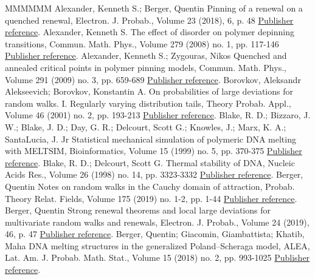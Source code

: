 \documentclass[11pt]{article}
\theoremstyle{definition}
\numberwithin{equation}{section}
\numberwithin{figure}{section}
\numberwithin{table}{section}
\begin{document}
\begin{thebibliography}{MMMMMM}
 Alexander, Kenneth S.; Berger, Quentin Pinning of a renewal on a quenched renewal, Electron. J. Probab., Volume 23 (2018), 6, p. 48 \href{https://ahl.centre-mersenne.org/item/AHL_2020__3__299_0/#cf:AB18}{Publisher reference}.
 Alexander, Kenneth S. The effect of disorder on polymer depinning transitions, Commun. Math. Phys., Volume 279 (2008) no. 1, pp. 117-146 \href{https://ahl.centre-mersenne.org/item/AHL_2020__3__299_0/#cf:A08}{Publisher reference}.
 Alexander, Kenneth S.; Zygouras, Nikos Quenched and annealed critical points in polymer pinning models, Commun. Math. Phys., Volume 291 (2009) no. 3, pp. 659-689 \href{https://ahl.centre-mersenne.org/item/AHL_2020__3__299_0/#cf:AZ09}{Publisher reference}.
 Borovkov, Aleksandr Alekseevich; Borovkov, Konstantin A. On probabilities of large deviations for random walks. I. Regularly varying distribution tails, Theory Probab. Appl., Volume 46 (2001) no. 2, pp. 193-213 \href{https://ahl.centre-mersenne.org/item/AHL_2020__3__299_0/#cf:BB00}{Publisher reference}.
 Blake, R. D.; Bizzaro, J. W.; Blake, J. D.; Day, G. R.; Delcourt, Scott G.; Knowles, J.; Marx, K. A.; SantaLucia, J. Jr Statistical mechanical simulation of polymeric DNA melting with MELTSIM, Bioinformatics, Volume 15 (1999) no. 5, pp. 370-375 \href{https://ahl.centre-mersenne.org/item/AHL_2020__3__299_0/#cf:Blake2}{Publisher reference}.
 Blake, R. D.; Delcourt, Scott G. Thermal stability of DNA, Nucleic Acids Res., Volume 26 (1998) no. 14, pp. 3323-3332 \href{https://ahl.centre-mersenne.org/item/AHL_2020__3__299_0/#cf:Blake1}{Publisher reference}.
 Berger, Quentin Notes on random walks in the Cauchy domain of attraction, Probab. Theory Relat. Fields, Volume 175 (2019) no. 1-2, pp. 1-44 \href{https://ahl.centre-mersenne.org/item/AHL_2020__3__299_0/#cf:B17}{Publisher reference}.
 Berger, Quentin Strong renewal theorems and local large deviations for multivariate random walks and renewals, Electron. J. Probab., Volume 24 (2019), 46, p. 47 \href{https://ahl.centre-mersenne.org/item/AHL_2020__3__299_0/#cf:B}{Publisher reference}.
 Berger, Quentin; Giacomin, Giambattista; Khatib, Maha DNA melting structures in the generalized Poland–Scheraga model, ALEA, Lat. Am. J. Probab. Math. Stat., Volume 15 (2018) no. 2, pp. 993-1025 \href{https://ahl.centre-mersenne.org/item/AHL_2020__3__299_0/#cf:BGK}{Publisher reference}.

\end{thebibliography}
\end{document}
